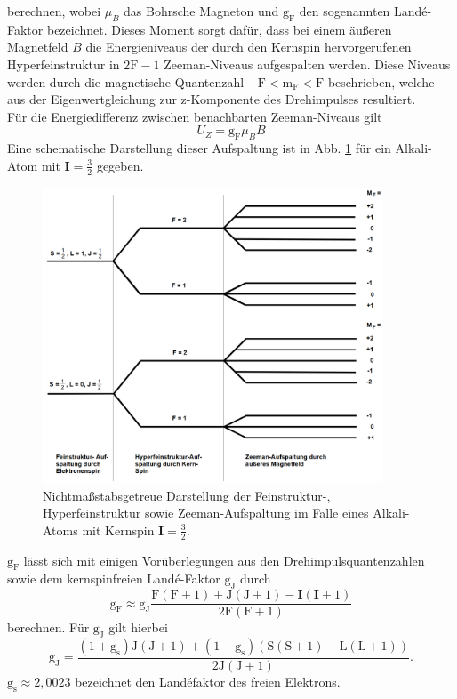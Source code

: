 berechnen, wobei $\mu_B$ das Bohrsche Magneton und $\text{g}_\text{F}$  den sogenannten Landé-Faktor bezeichnet.
Dieses Moment sorgt dafür, dass bei einem äußeren Magnetfeld $B$ die Energieniveaus der durch den Kernspin hervorgerufenen Hyperfeinstruktur in $2\text{F}-1$ Zeeman-Niveaus aufgespalten werden. Diese Niveaus werden durch die magnetische Quantenzahl $-\text{F}<\text{m}_\text{F}<\text{F}$ beschrieben, welche aus der Eigenwertgleichung zur z-Komponente des Drehimpulses resultiert.\\
Für die Energiedifferenz zwischen benachbarten Zeeman-Niveaus gilt
\begin{equation}
  U_{Z}=\text{g}_\text{F}\mu_B B
  \label{eqn:U}
\end{equation}
Eine schematische Darstellung dieser Aufspaltung ist in Abb. \ref{fig:Zeeman} für ein Alkali-Atom mit $\mathbf{I}= \frac{3}{2}$ gegeben.
\begin{figure}[H]
  \centering
  \includegraphics[width=0.9\textwidth]{./Niveaus.PNG}
  \caption{Nichtmaßstabsgetreue Darstellung der Feinstruktur-, Hyperfeinstruktur sowie Zeeman-Aufspaltung im Falle eines Alkali-Atoms mit Kernspin $\mathbf{I}= \frac{3}{2}$\cite{Anleitung}.}
  \label{fig:Zeeman}
\end{figure}
$\text{g}_\text{F}$ lässt sich mit einigen Vorüberlegungen aus den Drehimpulsquantenzahlen sowie dem kernspinfreien Landé-Faktor $\text{g}_\text{J}$ durch
\begin{equation}
  \text{g}_\text{F} \approx  \text{g}_\text{J} \frac{\text{F}\left(\text{F}+1\right)+\text{J}\left(\text{J}+1\right)-\mathbf{I}\left(\mathbf{I}+1\right)}{2\text{F}\left(\text{F}+1\right)}
  \label{eqn:gf}
\end{equation}
berechnen.
Für $\text{g}_\text{J}$ gilt hierbei
\begin{equation}
  \text{g}_\text{J} = \frac{(1+\text{g}_\text{s})\text{J}\left(\text{J}+1\right)+(1-\text{g}_\text{s})\left(\text{S}\left(\text{S}+1\right)-\text{L}\left(\text{L}+1\right)\right)}{2\text{J}\left(\text{J}+1\right)}.
  \label{eqn:gj}
\end{equation}
$\text{g}_\text{s}\approx 2,0023$ bezeichnet den Landéfaktor des freien Elektrons.\\

